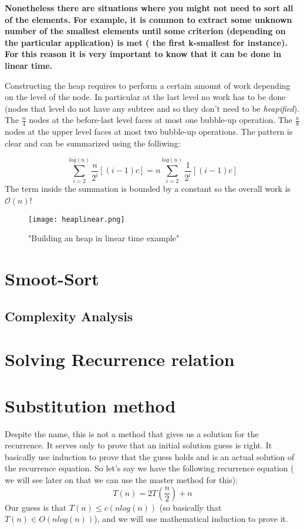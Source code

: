 \begin{framed}
\textbf{Nonetheless there are situations where you might not need to sort all of the elements. For example, it is common to extract some unknown number of the smallest elements until some criterion (depending
on the particular application) is met ( the first k-smallest for instance). For this reason it is very important to know  that it can be done in linear time.}

Constructing the heap requires to perform a certain amount of work depending on the level of the node. In particular at the last level no work has to be done (nodes  that level do not have any subtree and so they don't need to be \textit{heapified}).
The $\frac{n}{4}$ nodes at the before-last level faces at most one bubble-up operation.
The $\frac{n}{8}$ nodes at the upper level faces at most two bubble-up operations. The pattern is clear and can be summarized using the folliwing:

\[
\sum_{i=2}^{log(n)} \frac{n}{2^{i}}[(i-1)c] = n \sum_{i=2}^{log(n)} \frac{1}{2^{i}}[(i-1)c]
\]
The term inside the summation is bounded by a constant so the overall work is $\mathcal{O}(n)$!


\end{framed}
\begin{figure}
\label{fig:heaplinear}
\caption{"Building an heap in linear time example"}
		\texttt{[image: heaplinear.png]}
\end{figure}


\section{Smoot-Sort}

\subsection{Complexity Analysis}


\section{Solving Recurrence relation}

\section{Substitution method}
\label{sec:substitutionmethod}
Despite the name, this is not a method that gives us a solution for the recurrence. It serves only to prove that an initial solution guess is right. It basically use induction to prove that the guess holds and is an actual solution of the recurrence equation.
So let's say we have the following recurrence equation ( we will see later on that we can use the master method for this):
\[T(n) = 2T(\frac{n}{2}) + n\]
Our guess is that $T(n) \leq c(nlog(n))$ (so basically that $T(n) \in O(nlog(n))$), and we will use mathematical induction to prove it.

